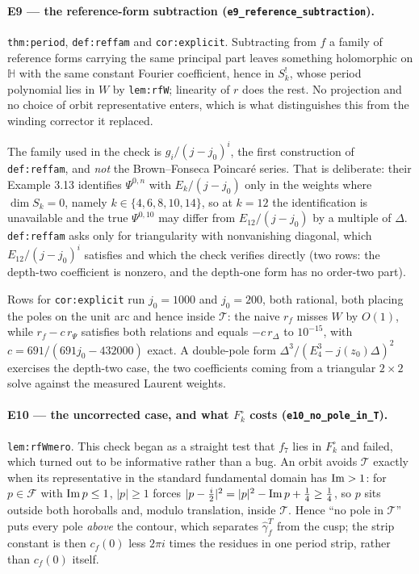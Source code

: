 \documentclass[11pt]{article}
\newcommand{\HH}{\mathbb{H}}
\newcommand{\code}[1]{\texttt{#1}}
\begin{document}
\paragraph{E9 --- the reference-form subtraction (\code{e9\_reference\_subtraction}).}
\code{thm:period}, \code{def:reffam} and \code{cor:explicit}. Subtracting from $f$ a family of
reference forms carrying the same principal part leaves something holomorphic on $\HH$ with the
same constant Fourier coefficient, hence in $S^!_k$, whose period polynomial lies in $W$ by
\code{lem:rfW}; linearity of $r$ does the rest. No projection and no choice of orbit
representative enters, which is what distinguishes this from the winding corrector it replaced.

The family used in the check is $g_i/(j-j_0)^i$, the first construction of \code{def:reffam}, and
\emph{not} the Brown--Fonseca Poincar\'e series. That is deliberate: their Example 3.13 identifies
$\Psi^{0,n}$ with $E_k/(j-j_0)$ only in the weights where $\dim S_k=0$, namely $k\in\{4,6,8,10,14\}$,
so at $k=12$ the identification is unavailable and the true $\Psi^{0,10}$ may differ from
$E_{12}/(j-j_0)$ by a multiple of $\Delta$. \code{def:reffam} asks only for triangularity with
nonvanishing diagonal, which $E_{12}/(j-j_0)^i$ satisfies and which the check verifies directly
(two rows: the depth-two coefficient is nonzero, and the depth-one form has no order-two part).

Rows for \code{cor:explicit} run $j_0=1000$ and $j_0=200$, both rational, both placing the poles on
the unit arc and hence inside $\mathcal T$: the naive $r_f$ misses $W$ by $O(1)$, while
$r_f-c\,r_{\Psi}$ satisfies both relations and equals $-c\,r_\Delta$ to $10^{-15}$, with
$c=691/(691j_0-432000)$ exact. A double-pole form $\Delta^3/(E_4^3-j(z_0)\Delta)^2$ exercises the
depth-two case, the two coefficients coming from a triangular $2\times2$ solve against the measured
Laurent weights.

\paragraph{E10 --- the uncorrected case, and what $F_k^\circ$ costs
(\code{e10\_no\_pole\_in\_T}).}
\code{lem:rfWmero}. This check began as a straight test that $f_7$ lies in $F_k^\circ$ and failed,
which turned out to be informative rather than a bug. An orbit avoids $\mathcal T$ exactly when its
representative in the standard fundamental domain has ${\rm Im}>1$: for $p\in\mathcal F$ with
${\rm Im}\,p\le1$, $|p|\ge1$ forces $|p-\tfrac i2|^2=|p|^2-{\rm Im}\,p+\tfrac14\ge\tfrac14$, so $p$
sits outside both horoballs and, modulo translation, inside $\mathcal T$. Hence ``no pole in
$\mathcal T$'' puts every pole \emph{above} the contour, which separates $\hat\gamma^T_f$ from the
cusp; the strip constant is then $c_f(0)$ less $2\pi i$ times the residues in one period strip,
rather than $c_f(0)$ itself.
\end{document}
